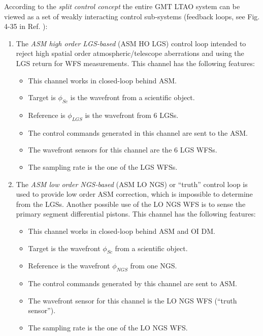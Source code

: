 According to the \emph{split control concept} 
the entire GMT LTAO system can be viewed as a set of weakly interacting
control sub-systems (feedback loops, see Fig. 4-35 in Ref.
\cite{GMT-LTAO-CODR}):
\begin{enumerate}
	\item The \emph{ASM high order LGS-based} (ASM HO LGS) 
	control loop intended to reject high spatial order atmospheric/telescope
	aberrations and using the LGS return for WFS measurements. This channel has
	the following features:
	\begin{itemize}
		\item This channel works in closed-loop behind ASM.
		\item Target is $\phi_{Sc}$ is the wavefront from a scientific object.
		\item Reference is $\phi_{LGS}$ is the wavefront from 6 LGSs.
	  \item The control commands generated in this channel are sent to the ASM.
	  \item The wavefront sensors for this channel are the 6 LGS WFSs.
	  \item The sampling rate is the one of the LGS WFSs.
	\end{itemize}

	\item The \emph{ASM low order NGS-based} (ASM LO NGS) or ``truth'' control
	loop is used to provide low order ASM correction, which is impossible to
	determine from the LGSs. Another possible use of the LO NGS WFS is to sense
	the primary segment differential pistons.  This channel has the following features:
	\begin{itemize}
		\item This channel works in closed-loop behind ASM and OI DM.
		\item Target is the wavefront $\phi_{Sc}$ from a scientific object.
		\item Reference is the wavefront $\phi_{NGS}$ from one NGS.
	  \item The control commands generated by this channel are sent to ASM.
	  \item The wavefront sensor for this channel is the LO NGS WFS (``truth
	  sensor'').
		\item The sampling rate is the one of the LO NGS WFS.
	\end{itemize}


\end{enumerate}
